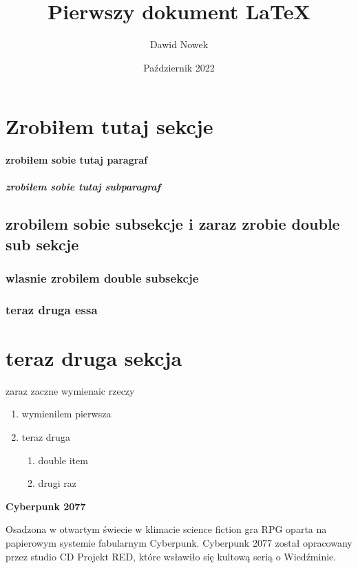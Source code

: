 \documentclass[a4paper]{article}
\title{Pierwszy dokument LaTeX}
\author{Dawid Nowek}
\date{Październik 2022}
\begin{document}
\maketitle
\newpage

	\section{Zrobiłem tutaj sekcje}
	\paragraph{zrobiłem sobie tutaj paragraf}
	\subparagraph{zrobiłem sobie tutaj subparagraf}
	\subsection{zrobilem sobie subsekcje i zaraz zrobie double sub sekcje}
	\subsubsection{wlasnie zrobilem double subsekcje}
	\subsubsection{teraz druga essa}

\section{teraz druga sekcja}

zaraz zaczne wymienaic rzeczy
\begin{enumerate}
	\item wymienilem pierwsza
	\item teraz druga
		\begin{enumerate}[A]

		\item double item
		\item drugi raz

		\end{enumerate}
\end{enumerate}


\newpage

{\huge\textbf{Cyberpunk 2077}}\newline


Osadzona w otwartym świecie w klimacie science fiction gra RPG oparta na papierowym systemie fabularnym Cyberpunk. Cyberpunk 2077 został opracowany przez studio CD Projekt RED, które wsławiło się kultową serią o Wiedźminie.\newline
\end{document}
